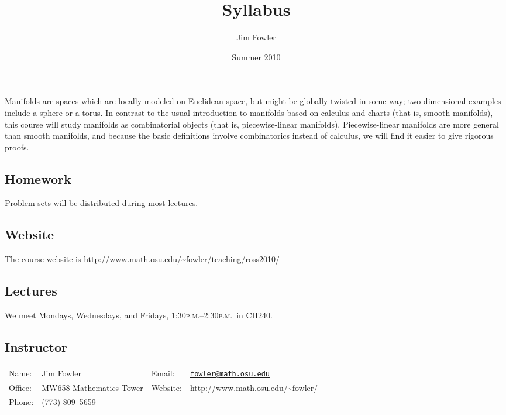 \documentclass[12pt]{handout}
\title{Syllabus}
\author{Jim Fowler}
\date{Summer 2010}
\newcommand{\peem}{\textsc{p.m.}}
\begin{document}
\maketitle

\noindent
Manifolds are spaces which are locally modeled on Euclidean space, but
might be globally twisted in some way; two-dimensional examples
include a sphere or a torus.  In contrast to the usual introduction to
manifolds based on calculus and charts (that is, smooth manifolds),
this course will study manifolds as combinatorial objects (that is,
piecewise-linear manifolds).  Piecewise-linear manifolds are more
general than smooth manifolds, and because the basic definitions
involve combinatorics instead of calculus, we will find it easier to
give rigorous proofs.

\subsection*{Homework}
Problem sets will be distributed during most lectures.

\subsection*{Website}
The course website is \url{http://www.math.osu.edu/~fowler/teaching/ross2010/}

\subsection*{Lectures}
We meet Mondays, Wednesdays, and Fridays,
1:30\peem--2:30\peem\ in CH240.

\subsection*{Instructor}
\vspace{1ex}%
\noindent\parbox{0.5\textwidth}{%
\noindent\begin{tabular}{@{}llll}
\textsf{Name:} & Jim Fowler & \textsf{Email:} & \href{mailto:fowler@math.osu.edu}{\texttt{fowler@math.osu.edu}} \\
\textsf{Office:} & MW658 Mathematics Tower & \textsf{Website:} & \url{http://www.math.osu.edu/~fowler/} \\
\textsf{Phone:} & (773) 809--5659 & & \\
\end{tabular}}

\end{document}
